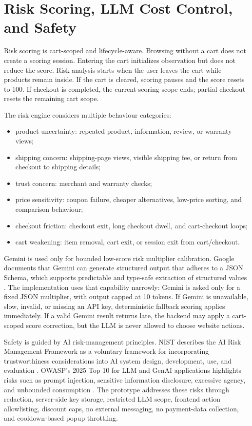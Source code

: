 \documentclass{article}
\begin{document}
\section{Risk Scoring, LLM Cost Control, and Safety}
Risk scoring is cart-scoped and lifecycle-aware. Browsing without a cart does not create a scoring session. Entering the cart initializes observation but does not reduce the score. Risk analysis starts when the user leaves the cart while products remain inside. If the cart is cleared, scoring pauses and the score resets to 100. If checkout is completed, the current scoring scope ends; partial checkout resets the remaining cart scope.

The risk engine considers multiple behaviour categories:
\begin{itemize}[leftmargin=*]
  \item product uncertainty: repeated product, information, review, or warranty views;
  \item shipping concern: shipping-page views, visible shipping fee, or return from checkout to shipping details;
  \item trust concern: merchant and warranty checks;
  \item price sensitivity: coupon failure, cheaper alternatives, low-price sorting, and comparison behaviour;
  \item checkout friction: checkout exit, long checkout dwell, and cart-checkout loops;
  \item cart weakening: item removal, cart exit, or session exit from cart/checkout.
\end{itemize}

Gemini is used only for bounded low-score risk multiplier calibration. Google documents that Gemini can generate structured output that adheres to a JSON Schema, which supports predictable and type-safe extraction of structured values \cite{google2026structured}. The implementation uses that capability narrowly: Gemini is asked only for a fixed JSON multiplier, with output capped at 10 tokens. If Gemini is unavailable, slow, invalid, or missing an API key, deterministic fallback scoring applies immediately. If a valid Gemini result returns late, the backend may apply a cart-scoped score correction, but the LLM is never allowed to choose website actions.

Safety is guided by AI risk-management principles. NIST describes the AI Risk Management Framework as a voluntary framework for incorporating trustworthiness considerations into AI system design, development, use, and evaluation \cite{nist2026airmf}. OWASP's 2025 Top 10 for LLM and GenAI applications highlights risks such as prompt injection, sensitive information disclosure, excessive agency, and unbounded consumption \cite{owasp2025llm}. The prototype addresses these risks through redaction, server-side key storage, restricted LLM scope, frontend action allowlisting, discount caps, no external messaging, no payment-data collection, and cooldown-based popup throttling.
\end{document}
